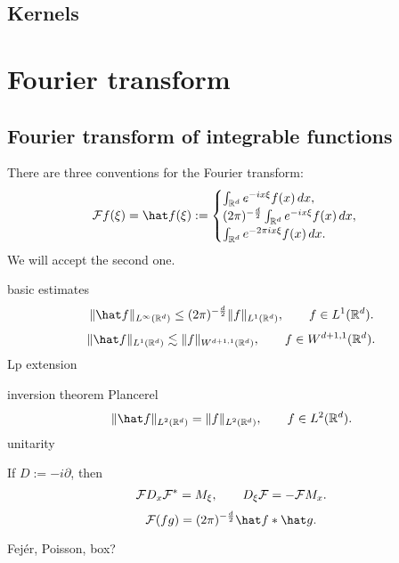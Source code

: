 \documentclass{../../large}
\begin{document}
\section{Kernels}
\begin{prb}
\end{prb}
\begin{prb}
\end{prb}










\chapter{Fourier transform}

\section{Fourier transform of integrable functions}
There are three conventions for the Fourier transform:
\[\cF f(\xi)=\hat f(\xi):=\begin{cases}
\int_{\R^d}e^{-ix\xi}f(x)\,dx,\\
(2\pi)^{-\frac d2}\int_{\R^d}e^{-ix\xi}f(x)\,dx,\\
\int_{\R^d}e^{-2\pi ix\xi}f(x)\,dx.
\end{cases}\]
We will accept the second one.


\begin{prb}
basic estimates
\[\|\hat f\|_{L^\infty(\R^d)}\le(2\pi)^{-\frac d2}\|f\|_{L^1(\R^d)},\qquad f\in L^1(\R^d).\]
\[\|\hat f\|_{L^1(\R^d)}\lesssim\|f\|_{W^{d+1,1}(\R^d)},\qquad f\in W^{d+1,1}(\R^d).\]
Lp extension
\end{prb}

\begin{prb}
inversion theorem
Plancerel
\[\|\hat f\|_{L^2(\R^d)}=\|f\|_{L^2(\R^d)},\qquad f\in L^2(\R^d).\]
unitarity
\end{prb}

\begin{prb}[Properties]
If $D:=-i\partial$, then
\[\mathcal{F} D_x\mathcal{F}^*=M_\xi,\qquad D_\xi\mathcal{F}=-\mathcal{F} M_x.\]
\[\cF(fg)=(2\pi)^{-\frac d2}\hat f*\hat g.\]
\end{prb}




\begin{prb}
Fej\'er, Poisson, box?
\end{prb}
\begin{prb}
\end{prb}
\end{document}
